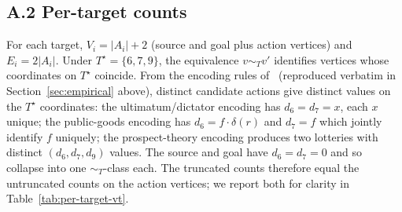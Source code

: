 \documentclass[11pt]{article}
\theoremstyle{definition}
\theoremstyle{remark}
\begin{document}
\subsection*{A.2 Per-target counts}

For each target, $V_i = |A_i| + 2$ (source and goal plus action vertices) and $E_i = 2|A_i|$.
Under $T^\star = \{6, 7, 9\}$, the equivalence $v \sim_T v'$ identifies vertices whose
coordinates on $T^\star$ coincide. From the encoding rules of~\cite[\S IV]{bond2026tcss}
(reproduced verbatim in Section~\ref{sec:empirical} above), distinct candidate actions give
distinct values on the $T^\star$ coordinates: the ultimatum/dictator encoding has $d_6 = d_7 = x$,
each $x$ unique; the public-goods encoding has $d_6 = f \cdot \delta(r)$ and $d_7 = f$ which
jointly identify $f$ uniquely; the prospect-theory encoding produces two lotteries with distinct
$(d_6, d_7, d_9)$ values. The source and goal have $d_6 = d_7 = 0$ and so collapse into one
$\sim_T$-class each. The truncated counts therefore equal the untruncated counts on the action
vertices; we report both for clarity in Table~\ref{tab:per-target-vt}.
\end{document}
